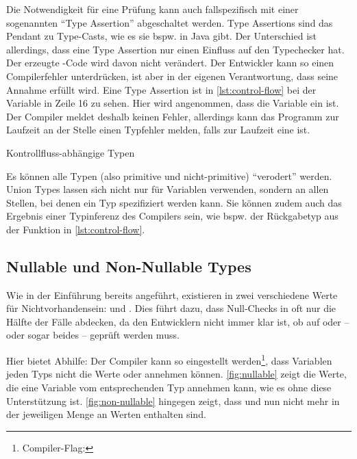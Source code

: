 \documentclass[a4paper]{scrartcl}
\begin{document}
Die Notwendigkeit für eine Prüfung kann auch fallspezifisch mit einer sogenannten \enquote{Type Assertion} abgeschaltet werden.
Type Assertions sind das Pendant zu Type-Casts, wie es sie bspw. in Java gibt.
Der Unterschied ist allerdings, dass eine Type Assertion nur einen Einfluss auf den Typechecker hat.
Der erzeugte \js-Code wird davon nicht verändert.
Der Entwickler kann so einen Compilerfehler unterdrücken, ist aber in der eigenen Verantwortung, dass seine Annahme erfüllt wird.
Eine Type Assertion ist in \autoref{lst:control-flow} bei der Variable  in Zeile 16 zu sehen.
Hier wird angenommen, dass die Variable  ein \tsstring{} ist.
Der Compiler meldet deshalb keinen Fehler, allerdings kann das Programm zur Laufzeit an der Stelle einen Typfehler melden, falls  zur Laufzeit eine \tsnumber{} ist.

\begin{listing}[htb]
	\centering
	\vspace*{-7mm}
	\caption{Kontrollfluss-abhängige Typen}
	\label{lst:control-flow}
\end{listing}

Es können alle Typen (also primitive und nicht-primitive) \enquote{verodert} werden.
Union Types lassen sich nicht nur für Variablen verwenden, sondern an allen Stellen, bei denen ein Typ spezifiziert werden kann.
Sie können zudem auch das Ergebnis einer Typinferenz des Compilers sein, wie bspw. der Rückgabetyp aus der Funktion in \autoref{lst:control-flow}.

\subsection{Nullable und Non-Nullable Types}\label{null-safety}
Wie in der Einführung bereits angeführt, existieren in \js{} zwei verschiedene Werte für Nichtvorhandensein: \tsnull{} und \tsundefined{}.
Dies führt dazu, dass Null-Checks in \js{} oft nur die Hälfte der Fälle abdecken, da den Entwicklern nicht immer klar ist, ob auf \tsnull{} oder \tsundefined{} -- oder sogar beides -- geprüft werden muss.

Hier bietet \ts{} Abhilfe:
Der Compiler kann so eingestellt werden\footnote{Compiler-Flag: }, dass Variablen jeden Typs nicht die Werte \tsnull{} oder \tsundefined{} annehmen können.
\autoref{fig:nullable} zeigt die Werte, die eine Variable vom entsprechenden Typ annehmen kann, wie es ohne diese Unterstützung ist.
\autoref{fig:non-nullable} hingegen zeigt, dass \tsnull{} und \tsundefined{} nun nicht mehr in der jeweiligen Menge an Werten enthalten sind.
\end{document}
